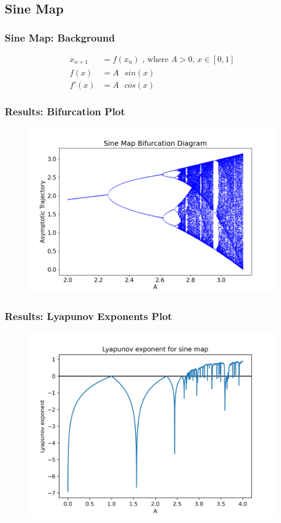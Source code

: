 \documentclass[
	11pt, %
	aspectratio=169, %
]{beamer}
\begin{document}

\subsection{Sine Map}

\begin{frame}
        \frametitle{Sine Map: Background}
        \begin{align*}
            x_{n+1} &= f(x_n) \text{ , where $A > 0$, $x \in [0,1]$} \\
            f(x) &= A\text{ }sin(x) \\
            f'(x) &= A\text{ }cos(x)
        \end{align*}
\end{frame}


\begin{frame}
        \frametitle{Results: Bifurcation Plot}
    \begin{figure}
        \includegraphics[width=0.6\linewidth]
        {sine_bifurcation_diagram.png}
    \end{figure}
\end{frame}


\begin{frame}
        \frametitle{Results: Lyapunov Exponents Plot}
    \begin{figure}
        \includegraphics[width=0.6\linewidth]
        {sine_lyapunov_exp.png}
    \end{figure}
\end{frame}
\end{document}
